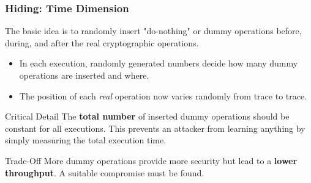 \begin{frame}
    \frametitle{Hiding: Time Dimension}

    The basic idea is to randomly insert "do-nothing" or dummy operations before, during, and after the real cryptographic operations.

    \begin{itemize}
        \item In each execution, randomly generated numbers decide how many dummy operations are inserted and where.
        \item The position of each \textit{real} operation now varies randomly from trace to trace.
    \end{itemize}

    \begin{alertblock}{Critical Detail}
        The \textbf{total number} of inserted dummy operations should be constant for all executions. This prevents an attacker from learning anything by simply measuring the total execution time.
    \end{alertblock}

    \begin{block}{Trade-Off}
        More dummy operations provide more security but lead to a \textbf{lower throughput}. A suitable compromise must be found.
    \end{block}

\end{frame}

